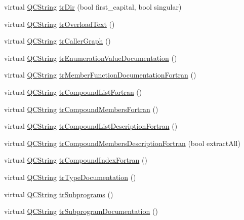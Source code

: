 \begin{DoxyCompactItemize}
\item 
virtual \hyperlink{class_q_c_string}{Q\-C\-String} \hyperlink{class_translator_portuguese_abb2b35bd374b96530198bf061054c951}{tr\-Dir} (bool first\-\_\-capital, bool singular)
\item 
virtual \hyperlink{class_q_c_string}{Q\-C\-String} \hyperlink{class_translator_portuguese_ac5436cb286c48cd540d0cdce200a82b9}{tr\-Overload\-Text} ()
\item 
virtual \hyperlink{class_q_c_string}{Q\-C\-String} \hyperlink{class_translator_portuguese_ae1d7d38cc426cd25124b1658b1125841}{tr\-Caller\-Graph} ()
\item 
virtual \hyperlink{class_q_c_string}{Q\-C\-String} \hyperlink{class_translator_portuguese_a4039294191fddf0e9530b920719998fd}{tr\-Enumeration\-Value\-Documentation} ()
\item 
virtual \hyperlink{class_q_c_string}{Q\-C\-String} \hyperlink{class_translator_portuguese_a006270b30df57f83fe40ad0ed617652e}{tr\-Member\-Function\-Documentation\-Fortran} ()
\item 
virtual \hyperlink{class_q_c_string}{Q\-C\-String} \hyperlink{class_translator_portuguese_a17985bd956c4940e53e169cadb659c2b}{tr\-Compound\-List\-Fortran} ()
\item 
virtual \hyperlink{class_q_c_string}{Q\-C\-String} \hyperlink{class_translator_portuguese_add44aa8baf655554ec74dbfac0d43f71}{tr\-Compound\-Members\-Fortran} ()
\item 
virtual \hyperlink{class_q_c_string}{Q\-C\-String} \hyperlink{class_translator_portuguese_a10aa72b35051f95ba30f2b0312ce705c}{tr\-Compound\-List\-Description\-Fortran} ()
\item 
virtual \hyperlink{class_q_c_string}{Q\-C\-String} \hyperlink{class_translator_portuguese_a0c98da65b5772e9c2876855a42d44127}{tr\-Compound\-Members\-Description\-Fortran} (bool extract\-All)
\item 
virtual \hyperlink{class_q_c_string}{Q\-C\-String} \hyperlink{class_translator_portuguese_a933624b6cffb8fdc03e9fc4110640fc9}{tr\-Compound\-Index\-Fortran} ()
\item 
virtual \hyperlink{class_q_c_string}{Q\-C\-String} \hyperlink{class_translator_portuguese_ae031421205271f1a32fa3838a79b8902}{tr\-Type\-Documentation} ()
\item 
virtual \hyperlink{class_q_c_string}{Q\-C\-String} \hyperlink{class_translator_portuguese_a8d4e1de8fb5c2af1fd073c682556f999}{tr\-Subprograms} ()
\item 
virtual \hyperlink{class_q_c_string}{Q\-C\-String} \hyperlink{class_translator_portuguese_add6df0842eb6016d108814567d677055}{tr\-Subprogram\-Documentation} ()

\end{DoxyCompactItemize}
